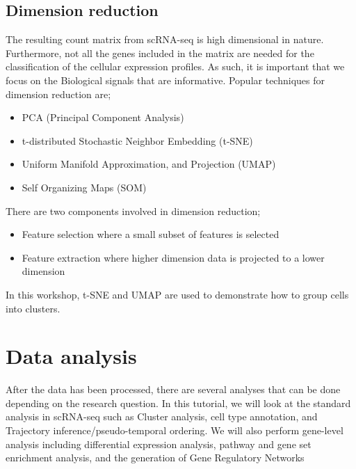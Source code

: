 \documentclass[
]{book}
\providecommand{\tightlist}{%
  \setlength{\itemsep}{0pt}\setlength{\parskip}{0pt}}
\begin{document}
\hypertarget{dimension-reduction}{%
\subsection{Dimension reduction}\label{dimension-reduction}}

The resulting count matrix from scRNA-seq is high dimensional in nature. Furthermore, not all the genes included in the matrix are needed for the classification of the cellular expression profiles. As such, it is important that we focus on the Biological signals that are informative. Popular techniques for dimension reduction are;

\begin{itemize}
\tightlist
\item
  PCA (Principal Component Analysis)
\item
  t-distributed Stochastic Neighbor Embedding (t-SNE)
\item
  Uniform Manifold Approximation, and Projection (UMAP)
\item
  Self Organizing Maps (SOM)
\end{itemize}

There are two components involved in dimension reduction;

\begin{itemize}
\tightlist
\item
  Feature selection where a small subset of features is selected
\item
  Feature extraction where higher dimension data is projected to a lower dimension
\end{itemize}

In this workshop, t-SNE and UMAP are used to demonstrate how to group cells into clusters.

\hypertarget{data-analysis}{%
\section{Data analysis}\label{data-analysis}}

After the data has been processed, there are several analyses that can be done depending on the research question. In this tutorial, we will look at the standard analysis in scRNA-seq such as Cluster analysis, cell type annotation, and Trajectory inference/pseudo-temporal ordering. We will also perform gene-level analysis including differential expression analysis, pathway and gene set enrichment analysis, and the generation of Gene Regulatory Networks
\end{document}
